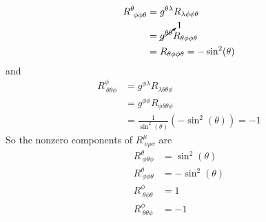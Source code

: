 \documentclass[11pt]{article}
\numberwithin{equation}{section}
\begin{document}
\begin{enumerate}[(a)]
\begin{align*}
R^{\theta}_{\ \phi\phi\theta} &= g^{\theta\lambda}R_{\lambda\phi\phi\theta}\\
&= \cancelto{1}{g^{\theta\theta}}R_{\theta\phi\phi\theta}\\
&= R_{\theta\phi\phi\theta} = -\sin^2(\theta)
\end{align*}
and
\begin{align*}
R^{\phi}_{\ \theta\theta\phi} &= g^{\phi\lambda}R_{\lambda\theta\theta\phi}\\
&= g^{\phi\phi}R_{\phi\theta\theta\phi}\\
&= \frac{1}{\sin^2(\theta)}(-\sin^2(\theta)) = -1
\end{align*}
So the nonzero components of $R^{\mu}_{\ \nu\rho\sigma}$ are
\begin{align*}
R^{\theta}_{\ \phi\theta\phi} &= \sin^2(\theta)\\
R^{\theta}_{\ \phi\phi\theta} &= -\sin^2(\theta)\\
R^{\phi}_{\ \theta\phi\theta} &= 1\\
R^{\phi}_{\ \theta\theta\phi} &= -1
\end{align*}


\end{enumerate}
\end{document}

